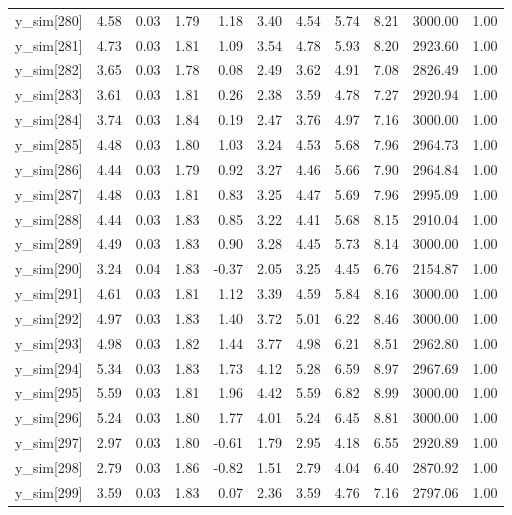 \begin{table}[ht]
\begin{tabular}{rrrrrrrrrrr}
  y\_sim[280] & 4.58 & 0.03 & 1.79 & 1.18 & 3.40 & 4.54 & 5.74 & 8.21 & 3000.00 & 1.00 \\ 
  y\_sim[281] & 4.73 & 0.03 & 1.81 & 1.09 & 3.54 & 4.78 & 5.93 & 8.20 & 2923.60 & 1.00 \\ 
  y\_sim[282] & 3.65 & 0.03 & 1.78 & 0.08 & 2.49 & 3.62 & 4.91 & 7.08 & 2826.49 & 1.00 \\ 
  y\_sim[283] & 3.61 & 0.03 & 1.81 & 0.26 & 2.38 & 3.59 & 4.78 & 7.27 & 2920.94 & 1.00 \\ 
  y\_sim[284] & 3.74 & 0.03 & 1.84 & 0.19 & 2.47 & 3.76 & 4.97 & 7.16 & 3000.00 & 1.00 \\ 
  y\_sim[285] & 4.48 & 0.03 & 1.80 & 1.03 & 3.24 & 4.53 & 5.68 & 7.96 & 2964.73 & 1.00 \\ 
  y\_sim[286] & 4.44 & 0.03 & 1.79 & 0.92 & 3.27 & 4.46 & 5.66 & 7.90 & 2964.84 & 1.00 \\ 
  y\_sim[287] & 4.48 & 0.03 & 1.81 & 0.83 & 3.25 & 4.47 & 5.69 & 7.96 & 2995.09 & 1.00 \\ 
  y\_sim[288] & 4.44 & 0.03 & 1.83 & 0.85 & 3.22 & 4.41 & 5.68 & 8.15 & 2910.04 & 1.00 \\ 
  y\_sim[289] & 4.49 & 0.03 & 1.83 & 0.90 & 3.28 & 4.45 & 5.73 & 8.14 & 3000.00 & 1.00 \\ 
  y\_sim[290] & 3.24 & 0.04 & 1.83 & -0.37 & 2.05 & 3.25 & 4.45 & 6.76 & 2154.87 & 1.00 \\ 
  y\_sim[291] & 4.61 & 0.03 & 1.81 & 1.12 & 3.39 & 4.59 & 5.84 & 8.16 & 3000.00 & 1.00 \\ 
  y\_sim[292] & 4.97 & 0.03 & 1.83 & 1.40 & 3.72 & 5.01 & 6.22 & 8.46 & 3000.00 & 1.00 \\ 
  y\_sim[293] & 4.98 & 0.03 & 1.82 & 1.44 & 3.77 & 4.98 & 6.21 & 8.51 & 2962.80 & 1.00 \\ 
  y\_sim[294] & 5.34 & 0.03 & 1.83 & 1.73 & 4.12 & 5.28 & 6.59 & 8.97 & 2967.69 & 1.00 \\ 
  y\_sim[295] & 5.59 & 0.03 & 1.81 & 1.96 & 4.42 & 5.59 & 6.82 & 8.99 & 3000.00 & 1.00 \\ 
  y\_sim[296] & 5.24 & 0.03 & 1.80 & 1.77 & 4.01 & 5.24 & 6.45 & 8.81 & 3000.00 & 1.00 \\ 
  y\_sim[297] & 2.97 & 0.03 & 1.80 & -0.61 & 1.79 & 2.95 & 4.18 & 6.55 & 2920.89 & 1.00 \\ 
  y\_sim[298] & 2.79 & 0.03 & 1.86 & -0.82 & 1.51 & 2.79 & 4.04 & 6.40 & 2870.92 & 1.00 \\ 
  y\_sim[299] & 3.59 & 0.03 & 1.83 & 0.07 & 2.36 & 3.59 & 4.76 & 7.16 & 2797.06 & 1.00 \\ 

\end{tabular}
\end{table}

